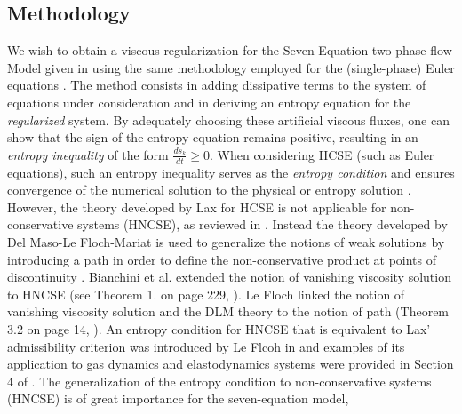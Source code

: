 \subsection{Methodology}
%
We wish to obtain a viscous regularization for the Seven-Equation two-phase flow Model given in  using the same methodology 
employed for the (single-phase) Euler equations \cite{jlg_VR_SIAM_2004,Marco_paper_low_mach}. The method consists in adding dissipative terms to the system of equations under 
consideration and in deriving an entropy equation for the {\it regularized} system. By adequately choosing these artificial viscous fluxes, one can 
show that the sign of the entropy equation remains positive, resulting in an \emph{entropy inequality} of the form $\frac{d s_k}{dt} \geq 0$. When considering 
HCSE (such as Euler equations), such an entropy inequality serves as the \emph{entropy condition} and ensures convergence of the numerical solution to
the physical or entropy solution \cite{Lax}. However, the theory developed by Lax for HCSE \cite{Lax} is not applicable for non-conservative systems (HNCSE), as reviewed in .
Instead the theory developed by Del Maso-Le Floch-Mariat is used to generalize the notions of weak solutions by introducing a path 
in order to define the non-conservative product at points of discontinuity \cite{dlm}. 
Bianchini et al. extended the notion of vanishing viscosity solution to HNCSE (see Theorem 1. on page 229,  \cite{bianchini_bressan_2005}). 
Le Floch linked the notion of vanishing viscosity solution and the DLM theory to the notion of path (Theorem 3.2 on page 14, \cite{lefloch_1989}). 
An entropy condition for HNCSE that is equivalent to Lax' admissibility criterion was introduced by Le Flcoh in \cite{lefloch_1988} and 
examples of its application to gas dynamics and elastodynamics systems were provided in Section 4 of \cite{lefloch_1988}. 
The generalization of the entropy condition to non-conservative systems (HNCSE) is of great importance for the seven-equation model,
